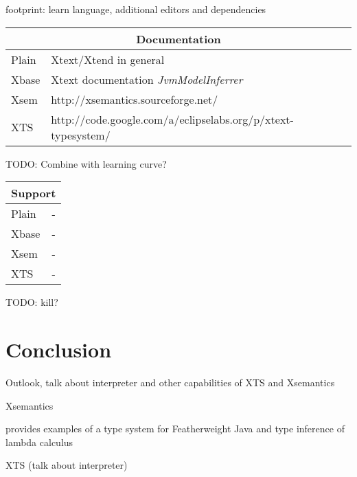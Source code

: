 footprint: learn language, additional editors and dependencies

\begin{tabularx}{\linewidth}{ l   X }
\multicolumn{2}{c}{Documentation} \\ \hline
Plain & Xtext/Xtend in general \\
Xbase & Xtext documentation \emph{JvmModelInferrer} \\
Xsem & http://xsemantics.sourceforge.net/ \\
XTS & http://code.google.com/a/eclipselabs.org/p/xtext-typesystem/ \\
\end{tabularx}

TODO: Combine with learning curve?

\begin{tabularx}{\linewidth}{ l   X }
\multicolumn{2}{c}{Support} \\ \hline
Plain & - \\
Xbase & - \\
Xsem & - \\
XTS & - \\
\end{tabularx}

TODO: kill?


 \section{Conclusion}

Outlook, talk about interpreter and other capabilities of XTS and Xsemantics

Xsemantics 

provides examples of a type system for Featherweight Java and
type inference of lambda calculus
 
XTS (talk about interpreter)

